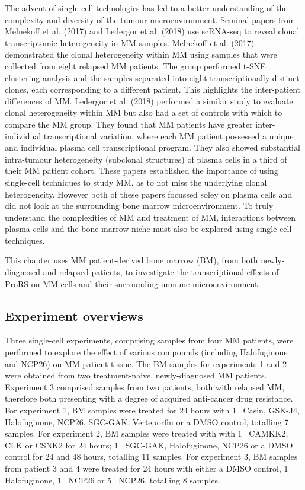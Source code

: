 The advent of single-cell technologies has led to a better understanding of the complexity and diversity of the tumour microenvironment.
Seminal papers from Melnekoff et al. (2017)\cite{melnekoff2017single} and Ledergor et al. (2018)\cite{ledergor2018single} use scRNA-seq to reveal clonal transcriptomic heterogeneity in MM samples.
Melnekoff et al. (2017) demonstrated the clonal heterogeneity within MM using samples that were collected from eight relapsed MM patients.
The group performed t-SNE clustering analysis and the samples separated into eight transcriptionally distinct clones, each corresponding to a different patient.
This highlights the inter-patient differences of MM\@.
Ledergor et al. (2018) performed a similar study to evaluate clonal heterogeneity within MM but also had a set of controls with which to compare the MM group.
They found that MM patients have greater inter-individual transcriptional variation, where each MM patient possessed a unique and individual plasma cell transcriptional program.
They also showed substantial intra-tumour heterogeneity (subclonal structures) of plasma cells in a third of their MM patient cohort.
These papers established the importance of using single-cell techniques to study MM, as to not miss the underlying clonal heterogeneity.
However both of these papers focussed soley on plasma cells and did not look at the surrounding bone marrow microenvironment.
To truly understand the complexities of MM and treatment of MM, interactions between plasma cells and the bone marrow niche must also be explored using single-cell techniques.

This chapter uses MM patient-derived bone marrow (BM), from both newly-diagnosed and relapsed patients, to investigate the transcriptional effects of ProRS on MM cells and their surrounding immune microenvironment.

\subsection{Experiment overviews}\label{subsec:scrna_experiment}
Three single-cell experiments, comprising samples from four MM patients, were performed to explore the effect of various compounds (including Halofuginone and NCP26) on MM patient tissue.
The BM samples for experiments 1 and 2 were obtained from two treatment-naive, newly-diagnosed MM patients.
Experiment 3 comprised samples from two patients, both with relapsed MM, therefore both presenting with a degree of acquired anti-cancer drug resistance.
For experiment 1, BM samples were treated for 24 hours with 1\si{\micro\Molar} Casin, GSK-J4, Halofuginone, NCP26, SGC-GAK, Verteporfin or a DMSO control, totalling 7 samples.
For experiment 2, BM samples were treated with with 1\si{\micro\Molar} CAMKK2, CLK or CSNK2 for 24 hours; 1\si{\micro\Molar} SGC-GAK, Halofuginone, NCP26 or a DMSO control for 24 and 48 hours, totalling 11 samples.
For experiment 3, BM samples from patient 3 and 4 were treated for 24 hours with either a DMSO control, 1\si{\micro\Molar} Halofuginone, 1\si{\micro\Molar} NCP26 or 5\si{\micro\Molar} NCP26, totalling 8 samples.

